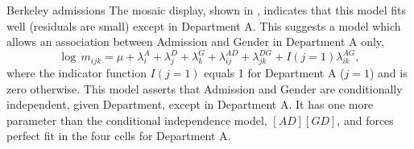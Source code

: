 \documentclass[11pt]{book}\usepackage[]{graphicx}\usepackage[]{color}
\newenvironment{knitrout}{}{} %
\renewenvironment{knitrout}{\small\renewcommand{\baselinestretch}{.85}}{} %
\begin{document}
\begin{Example}[berkeley6]{Berkeley admissions}
\begin{knitrout}
\end{knitrout}
The mosaic display, shown in , indicates that this model fits well
(residuals are small) except in Department A.
This suggests a model which allows an association between Admission and Gender in Department
A only,
\begin{equation}\label{eq:berk2}
  \log \,  m_{ijk}  =
  \mu
  +  \lambda_i^A
  +  \lambda_j^D
  +  \lambda_k^G
  +  \lambda_{ij}^{AD}
  +  \lambda_{jk}^{DG}
  +  I(j=1) \lambda_{ik}^{AG} \comma
\end{equation}
where the indicator function
$I(j=1) $ equals 1 for Department A ($j=1$) and is zero otherwise.
This model asserts that Admission and Gender are conditionally independent,
given Department, except in Department A.  It has one more parameter than
the conditional independence model, $[AD] [GD]$, and forces perfect fit
in the four cells for Department A.


\end{Example}
\end{document}
